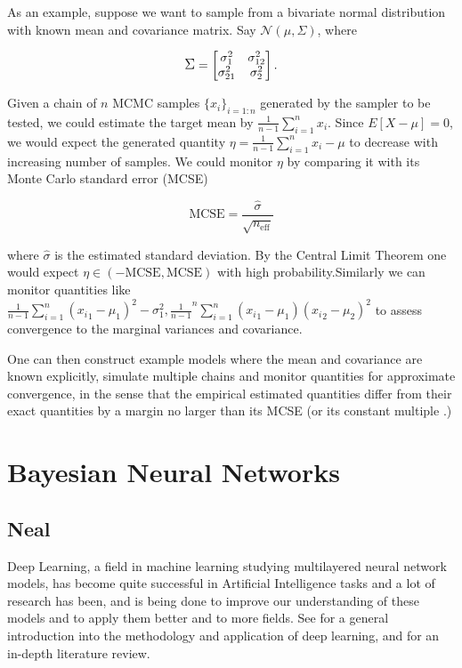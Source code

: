 \documentclass[]{report}
\begin{document}
As an example, suppose we want to sample from a bivariate normal distribution with known mean and covariance matrix. Say $\mathcal{N}(\mu,\Sigma) $, where 

\begin{displaymath}
\mathlarger{\Sigma} = 
\begin{bmatrix}
\sigma^2_1 &\sigma_{12}^2 \\
\sigma_{21}^2 &\sigma^2_2 \\
\end{bmatrix}.
\end{displaymath}

Given a chain of $n$ MCMC samples $\{x_i\}_{i=1:n}$ generated by the sampler to be tested, we could estimate  the target mean by $ \frac{1}{n-1} \sum_{i=1}^ n x_i$. Since $E[X-\mu] = 0$, we would expect the generated quantity $\eta= \frac{1}{n-1} \sum_{i=1}^ n x_i -\mu$ to decrease with increasing number of samples. We could monitor $\eta$ by comparing it with its Monte Carlo standard error (MCSE) 

\[ \text{MCSE} = \frac{\hat{\sigma}}{\sqrt{n_{\text{eff}}}} \]

where $\hat{\sigma}$ is the estimated standard deviation. By the Central Limit Theorem one would expect  $\eta \in (-\text{MCSE},\text{MCSE})$ with high probability.Similarly we can monitor quantities like $\frac{1}{n-1} \sum_{i=1}^n ({x_i}_1 -\mu_1)^2 - \sigma^2_1,  \frac{1}{n-1}^n \sum_{i=1}^n ({x_i}_1 - \mu_1)({x_i}_2 - \mu_2)^2 $ to assess convergence to the marginal variances and covariance.

One can then construct example models where the mean and covariance are known explicitly, simulate multiple chains and monitor quantities for approximate convergence, in the sense that the empirical estimated quantities differ from their exact quantities by a margin no larger than its MCSE (or its constant multiple .) 

\chapter{Bayesian Neural Networks}
\section{Neal}

Deep Learning, a field in machine learning studying multilayered neural network models, has become quite successful in Artificial Intelligence tasks and a lot of research has been, and is being done to improve our understanding of these models and to apply them better and to more fields. See \cite{Goodfellow-et-al-2016-Book,lecun2015deep} for a general introduction into the methodology and application of deep learning, and \cite{schmidhuber2015deep} for an in-depth literature review. 
\end{document}
